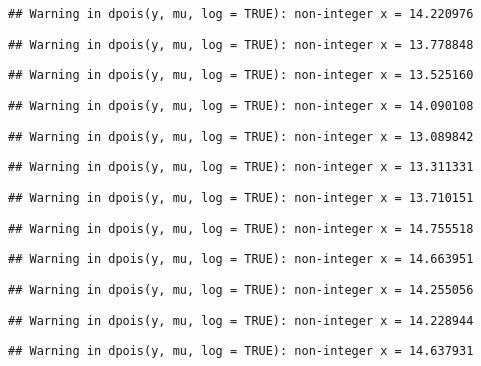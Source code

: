 \documentclass[
]{article}
\begin{document}
\begin{verbatim}
## Warning in dpois(y, mu, log = TRUE): non-integer x = 14.220976
\end{verbatim}

\begin{verbatim}
## Warning in dpois(y, mu, log = TRUE): non-integer x = 13.778848
\end{verbatim}

\begin{verbatim}
## Warning in dpois(y, mu, log = TRUE): non-integer x = 13.525160
\end{verbatim}

\begin{verbatim}
## Warning in dpois(y, mu, log = TRUE): non-integer x = 14.090108
\end{verbatim}

\begin{verbatim}
## Warning in dpois(y, mu, log = TRUE): non-integer x = 13.089842
\end{verbatim}

\begin{verbatim}
## Warning in dpois(y, mu, log = TRUE): non-integer x = 13.311331
\end{verbatim}

\begin{verbatim}
## Warning in dpois(y, mu, log = TRUE): non-integer x = 13.710151
\end{verbatim}

\begin{verbatim}
## Warning in dpois(y, mu, log = TRUE): non-integer x = 14.755518
\end{verbatim}

\begin{verbatim}
## Warning in dpois(y, mu, log = TRUE): non-integer x = 14.663951
\end{verbatim}

\begin{verbatim}
## Warning in dpois(y, mu, log = TRUE): non-integer x = 14.255056
\end{verbatim}

\begin{verbatim}
## Warning in dpois(y, mu, log = TRUE): non-integer x = 14.228944
\end{verbatim}

\begin{verbatim}
## Warning in dpois(y, mu, log = TRUE): non-integer x = 14.637931
\end{verbatim}
\end{document}
